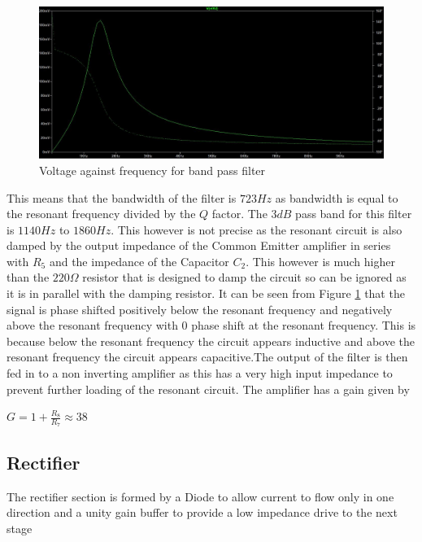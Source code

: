 \documentclass[10pt,a4paper]{article}
\begin{document}
\begin{figure}[!h]
\includegraphics[width=\textwidth]{BPFgraph}
\caption{Voltage against frequency for band pass filter}
\label{BPFgraph}
\end{figure}










   
This means that the bandwidth of the filter is $723Hz$ as bandwidth is equal to the resonant frequency divided by the $Q$ factor. The $3dB$ pass band for this filter is $1140Hz$ to $1860Hz$. This however is not precise as the resonant circuit is also damped by the output impedance of the Common Emitter amplifier in series with $R_5$ and the impedance of the Capacitor $C_2$. This however is much higher than the $220\Omega$ resistor that is designed to damp the circuit so can be ignored as it is in parallel with the damping resistor. It can be seen from Figure \ref{BPFgraph} that the signal is phase shifted positively below the resonant frequency and negatively above the resonant frequency with 0 phase shift     at the resonant frequency. This is because below the resonant frequency the circuit appears inductive and above the resonant frequency the circuit appears capacitive.The output of the filter is then fed in to a non inverting amplifier as this has a very high input impedance to prevent further loading of the resonant circuit. The amplifier has a gain given by
\begin{center}
\Huge

$G= 1+ \frac{R_8}{R_7}\approx 38$



\end{center}
\subsection{Rectifier}
The rectifier section is formed by a Diode to allow current to flow only in one direction and a unity gain buffer to provide a low impedance drive to the next stage
\end{document}
